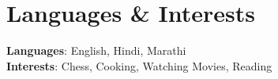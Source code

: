 \documentclass[letterpaper,11pt]{article}
\begin{document}

\section{Languages \& Interests}
 \begin{itemize}[leftmargin=0.15in, label={}]
    \small{\item{
     \textbf{Languages}{: English, Hindi, Marathi} \\
     \textbf{Interests}{: Chess, Cooking, Watching Movies, Reading}
    }}
 \end{itemize}

\end{document}

